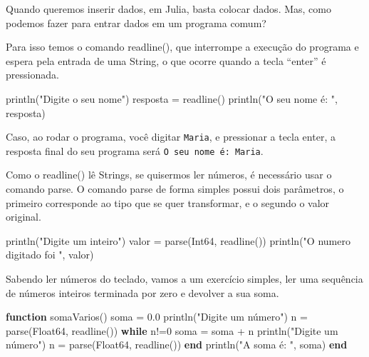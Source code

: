 \documentclass[
  letterpaper,
  DIV=11,
  numbers=noendperiod]{scrreprt}
\newenvironment{Shaded}{\begin{snugshade}}{\end{snugshade}}
\newcommand{\ControlFlowTok}[1]{\textcolor[rgb]{0.00,0.23,0.31}{\textbf{#1}}}
\newcommand{\DataTypeTok}[1]{\textcolor[rgb]{0.68,0.00,0.00}{#1}}
\newcommand{\FloatTok}[1]{\textcolor[rgb]{0.68,0.00,0.00}{#1}}
\newcommand{\FunctionTok}[1]{\textcolor[rgb]{0.28,0.35,0.67}{#1}}
\newcommand{\KeywordTok}[1]{\textcolor[rgb]{0.00,0.23,0.31}{\textbf{#1}}}
\newcommand{\NormalTok}[1]{\textcolor[rgb]{0.00,0.23,0.31}{#1}}
\newcommand{\OperatorTok}[1]{\textcolor[rgb]{0.37,0.37,0.37}{#1}}
\newcommand{\StringTok}[1]{\textcolor[rgb]{0.13,0.47,0.30}{#1}}
\begin{document}
Quando queremos inserir dados, em Julia, basta colocar dados. Mas, como
podemos fazer para entrar dados em um programa comum?

Para isso temos o comando readline(), que interrompe a execução do
programa e espera pela entrada de uma String, o que ocorre quando a
tecla ``enter'' é pressionada.

\begin{Shaded}
\begin{Highlighting}[]
\FunctionTok{println}\NormalTok{(}\StringTok{"Digite o seu nome"}\NormalTok{)}
\NormalTok{resposta }\OperatorTok{=} \FunctionTok{readline}\NormalTok{()}
\FunctionTok{println}\NormalTok{(}\StringTok{"O seu nome é: "}\NormalTok{, resposta)}
\end{Highlighting}
\end{Shaded}

Caso, ao rodar o programa, você digitar \texttt{Maria}, e pressionar a
tecla enter, a resposta final do seu programa será
\texttt{O\ seu\ nome\ é:\ Maria}.

Como o readline() lê Strings, se quisermos ler números, é necessário
usar o comando parse. O comando parse de forma simples possui dois
parâmetros, o primeiro corresponde ao tipo que se quer transformar, e o
segundo o valor original.

\begin{Shaded}
\begin{Highlighting}[]
\FunctionTok{println}\NormalTok{(}\StringTok{"Digite um inteiro"}\NormalTok{)}
\NormalTok{valor }\OperatorTok{=} \FunctionTok{parse}\NormalTok{(}\DataTypeTok{Int64}\NormalTok{, }\FunctionTok{readline}\NormalTok{())}
\FunctionTok{println}\NormalTok{(}\StringTok{"O numero digitado foi "}\NormalTok{, valor)}
\end{Highlighting}
\end{Shaded}

Sabendo ler números do teclado, vamos a um exercício simples, ler uma
sequência de números inteiros terminada por zero e devolver a sua soma.

\begin{Shaded}
\begin{Highlighting}[]
\KeywordTok{function} \FunctionTok{somaVarios}\NormalTok{()}
\NormalTok{    soma }\OperatorTok{=} \FloatTok{0.0}
    \FunctionTok{println}\NormalTok{(}\StringTok{"Digite um número"}\NormalTok{)}
\NormalTok{    n }\OperatorTok{=} \FunctionTok{parse}\NormalTok{(}\DataTypeTok{Float64}\NormalTok{, }\FunctionTok{readline}\NormalTok{())}
    \ControlFlowTok{while}\NormalTok{  n}\OperatorTok{!=}\FloatTok{0}
\NormalTok{        soma }\OperatorTok{=}\NormalTok{ soma }\OperatorTok{+}\NormalTok{ n}
        \FunctionTok{println}\NormalTok{(}\StringTok{"Digite um número"}\NormalTok{)}
\NormalTok{        n }\OperatorTok{=} \FunctionTok{parse}\NormalTok{(}\DataTypeTok{Float64}\NormalTok{, }\FunctionTok{readline}\NormalTok{())}
    \ControlFlowTok{end}
    \FunctionTok{println}\NormalTok{(}\StringTok{"A soma é: "}\NormalTok{, soma)}
\KeywordTok{end}
\end{Highlighting}
\end{Shaded}
\end{document}
